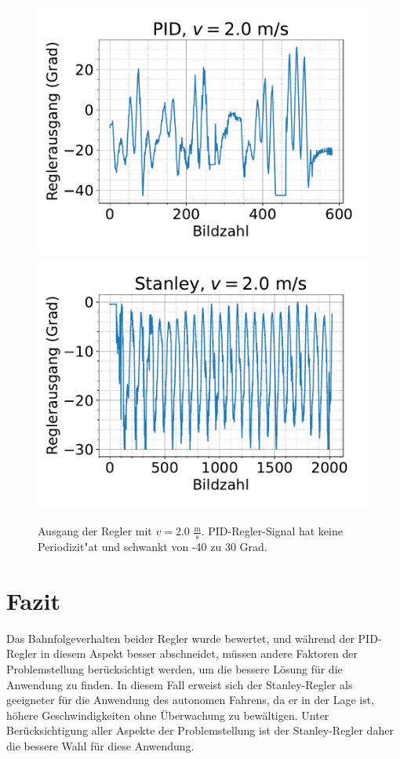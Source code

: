 \documentclass[arbeit=studie,oneside,BCOR=12mm]{ArbeitRST}
\begin{document}
\begin{figure}[h]
    \centering
    \includegraphics[scale=0.47]{pid2.0}
    \includegraphics[scale=0.47]{Stan2.0}
    \caption{Ausgang der Regler mit $v = 2.0$ $\frac{\mathrm{m}}{\mathrm{s}}$. PID-Regler-Signal hat keine Periodizit"at
    und schwankt von -40 zu 30 Grad. }
    \label{reg:2.0}
\end{figure}




\chapter{Fazit}

Das Bahnfolgeverhalten beider Regler wurde bewertet, und während der PID-Regler
in diesem Aspekt besser abschneidet, müssen andere Faktoren der Problemstellung
berücksichtigt werden, um die bessere Lösung für die Anwendung zu finden. In
diesem Fall erweist sich der Stanley-Regler als geeigneter für die Anwendung
des autonomen Fahrens, da er in der Lage ist, höhere Geschwindigkeiten ohne
Überwachung zu bewältigen. Unter Berücksichtigung aller Aspekte der
Problemstellung ist der Stanley-Regler daher die bessere Wahl für diese
Anwendung.
\end{document}

